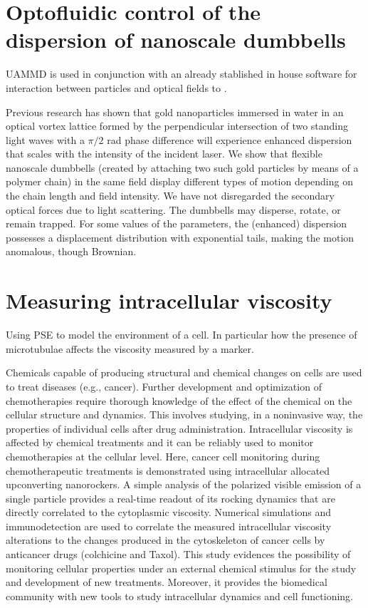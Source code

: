 \documentclass[ twoside,openright,titlepage,numbers=noenddot,%
headinclude,footinclude,cleardoublepage=empty,abstract=on,
BCOR=5mm,paper=a4,fontsize=11pt, dvipsnames
]{scrreprt}
\newcommand{\uammd}{\gls{UAMMD}\xspace}
\begin{document}
\chapter{Optofluidic control of the dispersion of nanoscale dumbbells}

\uammd is used in conjunction with an already stablished in house software for interaction between particles and optical fields to .

Previous research has shown that gold nanoparticles immersed in water in an optical vortex lattice formed by the perpendicular intersection of two standing light waves with a $\pi/2$ rad phase difference will experience enhanced dispersion that scales with the intensity of the incident laser. We show that flexible nanoscale dumbbells (created by attaching two such gold particles by means of a polymer chain) in the same field display different types of motion depending on the chain length and field intensity. We have not disregarded the secondary optical forces due to light scattering. The dumbbells may disperse, rotate, or remain trapped. For some values of the parameters, the (enhanced) dispersion possesses a displacement distribution with exponential tails, making the motion anomalous, though Brownian.

\chapter{Measuring intracellular viscosity}

Using \gls{PSE} to model the environment of a cell. In particular how the presence of microtubulae affects the viscosity measured by a marker.

Chemicals capable of producing structural and chemical changes on cells are used to treat diseases (e.g., cancer). Further development and optimization of chemotherapies require thorough knowledge of the effect of the chemical on the cellular structure and dynamics. This involves studying, in a noninvasive way, the properties of individual cells after drug administration. Intracellular viscosity is affected by chemical treatments and it can be reliably used to monitor chemotherapies at the cellular level. Here, cancer cell monitoring during chemotherapeutic treatments is demonstrated using intracellular allocated upconverting nanorockers. A simple analysis of the polarized visible emission of a single particle provides a real-time readout of its rocking dynamics that are directly correlated to the cytoplasmic viscosity. Numerical simulations and immunodetection are used to correlate the measured intracellular viscosity alterations to the changes produced in the cytoskeleton of cancer cells by anticancer drugs (colchicine and Taxol). This study evidences the possibility of monitoring cellular properties under an external chemical stimulus for the study and development of new treatments. Moreover, it provides the biomedical community with new tools to study intracellular dynamics and cell functioning.
\end{document}
